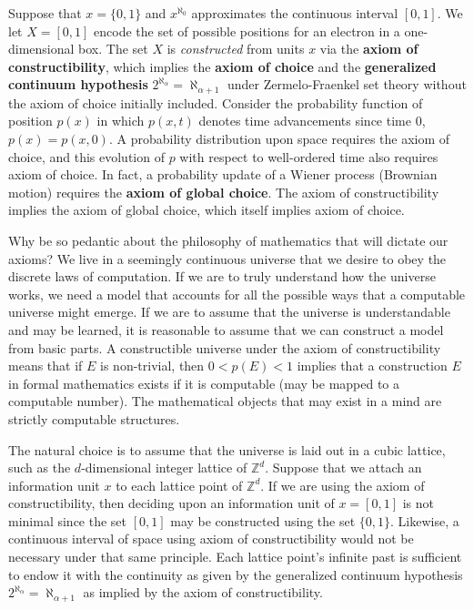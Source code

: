 \documentclass[10pt, a5paper, twoside, openright]{memoir}
\begin{document}
Suppose that $x = \{0, 1\}$ and $x^{\aleph_0}$ approximates the continuous interval $[0, 1]$. We let $X = [0 ,1]$ encode the set of possible positions for an electron in a one-dimensional box. The set $X$ is \textit{constructed} from units $x$ via the \textbf{axiom of constructibility}, which implies the \textbf{axiom of choice} and the \textbf{generalized continuum hypothesis} $2^{\aleph_\alpha} = \aleph_{\alpha+1}$ under Zermelo-Fraenkel set theory without the axiom of choice initially included. Consider the probability function of position $p(x)$ in which $p(x,t)$ denotes time advancements since time $0$, $p(x) = p(x, 0)$. A probability distribution upon space requires the axiom of choice, and this evolution of $p$ with respect to well-ordered time also requires axiom of choice. In fact, a probability update of a Wiener process (Brownian motion) requires the \textbf{axiom of global choice}. The axiom of constructibility implies the axiom of global choice, which itself implies axiom of choice.

Why be so pedantic about the philosophy of mathematics that will dictate our axioms? We live in a seemingly continuous universe that we desire to obey the discrete laws of computation. If we are to truly understand how the universe works, we need a model that accounts for all the possible ways that a computable universe might emerge. If we are to assume that the universe is understandable and may be learned, it is reasonable to assume that we can construct a model from basic parts. A constructible universe under the axiom of constructibility means that if $E$ is non-trivial, then $0 < p(E) <1$ implies that a construction $E$ in formal mathematics exists if it is computable (may be mapped to a computable number). The mathematical objects that may exist in a mind are strictly computable structures.

The natural choice is to assume that the universe is laid out in a cubic lattice, such as the $d$-dimensional integer lattice of $\mathbb Z^d$. Suppose that we attach an information unit $x$ to each lattice point of $\mathbb Z^d$. If we are using the axiom of constructibility, then deciding upon an information unit of $x = [0, 1]$ is not minimal since the set $[0, 1]$ may be constructed using the set $\{0, 1\}$. Likewise, a continuous interval of space using axiom of constructibility would not be necessary under that same principle. Each lattice point's infinite past is sufficient to endow it with the continuity as given by the generalized continuum hypothesis $2^{\aleph_\alpha} = \aleph_{\alpha+1}$ as implied by the axiom of constructibility.
\end{document}
